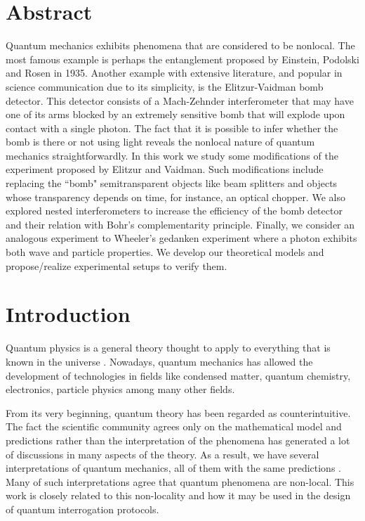 \documentclass[12pt]{book}
\newcommand\blankpage{
    \null
    \thispagestyle{empty}
    \addtocounter{page}{0}
    \newpage
    }
\begin{document}
\chapter*{Abstract}
\thispagestyle{plain}
Quantum mechanics exhibits phenomena that are considered to be nonlocal. The most famous example is perhaps the entanglement proposed by Einstein, Podolski and Rosen in 1935. Another example with extensive literature, and popular in science communication due to its simplicity, is the Elitzur-Vaidman bomb detector. This detector consists of a Mach-Zehnder interferometer that may have one of its arms blocked by an extremely sensitive bomb that will explode upon contact with a single photon. The fact that it is possible to infer whether the bomb is there or not using light reveals the nonlocal nature of quantum mechanics straightforwardly. In this work we study some modifications of the experiment proposed by Elitzur and Vaidman. Such modifications include replacing the ``bomb" semitransparent objects like beam splitters and objects whose transparency depends on time, for instance, an optical chopper. We also explored nested interferometers to increase the efficiency of the bomb detector and their relation with Bohr's complementarity principle. Finally, we consider an analogous experiment to Wheeler's gedanken experiment where a photon exhibits both wave and particle properties. We develop our theoretical models and propose/realize experimental setups to verify them. 


\pagebreak


\blankpage{}

\chapter*{Introduction}
\thispagestyle{plain}

Quantum physics is a general theory thought to apply to everything that is known in the universe \cite{balentine}. Nowadays, quantum mechanics has allowed the development of technologies in fields like condensed matter, quantum chemistry, electronics, particle physics among many other fields.

From its very beginning, quantum theory has been regarded as counterintuitive. The fact the scientific community agrees only on the mathematical model and predictions rather than the interpretation of the phenomena has generated a lot of discussions in many aspects of the theory. As a result, we have several interpretations of quantum mechanics, all of them with the same predictions \cite{interpre}. Many of such interpretations agree that quantum phenomena are non-local. This work is closely related to this non-locality and how it may be used in the design of quantum interrogation protocols.
\end{document}
